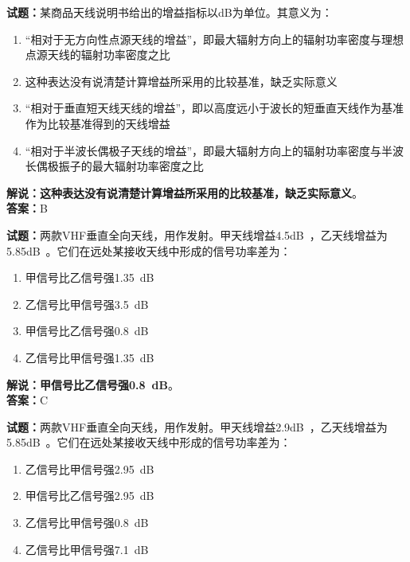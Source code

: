 \documentclass{ctexbook}
\begin{document}
\vspace{\baselineskip}

\noindent\textbf{试题：}某商品天线说明书给出的增益指标以\unit{\dB}为单位。其意义为：

\begin{enumerate}[leftmargin=3em]
  \item “相对于无方向性点源天线的增益”，即最大辐射方向上的辐射功率密度与理想点源天线的辐射功率密度之比
  \item 这种表达没有说清楚计算增益所采用的比较基准，缺乏实际意义
  \item “相对于垂直短天线天线的增益”，即以高度远小于波长的短垂直天线作为基准作为比较基准得到的天线增益
  \item “相对于半波长偶极子天线的增益”，即最大辐射方向上的辐射功率密度与半波长偶极振子的最大辐射功率密度之比
\end{enumerate}

\noindent\textbf{解说：这种表达没有说清楚计算增益所采用的比较基准，缺乏实际意义}。\\\noindent\textbf{答案：}B

\vspace{\baselineskip}

\noindent\textbf{试题：}两款VHF垂直全向天线，用作发射。甲天线增益\num{4.5}\unit[qualifier-mode=combine]{\deci\bel{}}，乙天线增益为\num{5.85}\unit[qualifier-mode=combine]{\deci\bel{}}。它们在远处某接收天线中形成的信号功率差为：

\begin{enumerate}[leftmargin=3em]
  \item 甲信号比乙信号强\qty{1.35}{\dB}
  \item 乙信号比甲信号强\qty{3.5}{\dB}
  \item 甲信号比乙信号强\qty{0.8}{\dB}
  \item 乙信号比甲信号强\qty{1.35}{\dB}
\end{enumerate}

\noindent\textbf{解说：甲信号比乙信号强\qty{0.8}{\dB}}。\\\noindent\textbf{答案：}C

\vspace{\baselineskip}

\noindent\textbf{试题：}两款VHF垂直全向天线，用作发射。甲天线增益\num{2.9}\unit[qualifier-mode=combine]{\deci\bel{}}，乙天线增益为\num{5.85}\unit[qualifier-mode=combine]{\deci\bel{}}。它们在远处某接收天线中形成的信号功率差为：

\begin{enumerate}[leftmargin=3em]
  \item 乙信号比甲信号强\qty{2.95}{\dB}
  \item 甲信号比乙信号强\qty{2.95}{\dB}
  \item 乙信号比甲信号强\qty{0.8}{\dB}
  \item 乙信号比甲信号强\qty{7.1}{\dB}
\end{enumerate}
\end{document}
